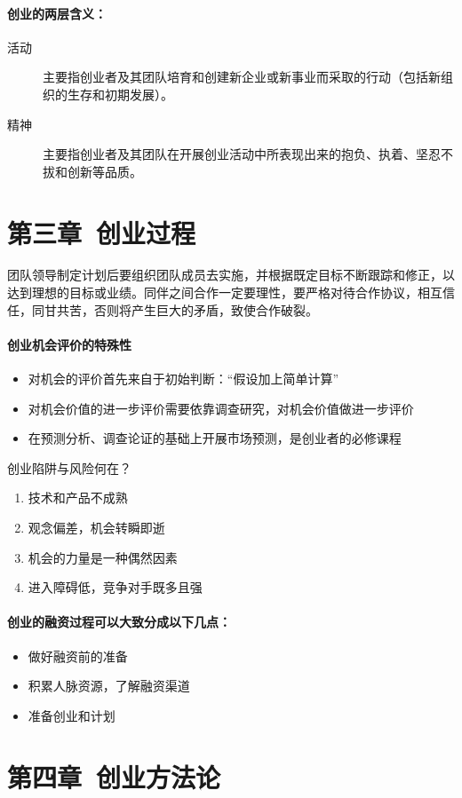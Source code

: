 \documentclass[UTF8]{article}
\begin{document}
\paragraph{创业的两层含义：}
\begin{description}
\item[活动]主要指创业者及其团队培育和创建新企业或新事业而采取的行动（包括新组织的生存和初期发展）。
\item[精神]主要指创业者及其团队在开展创业活动中所表现出来的抱负、执着、坚忍不拔和创新等品质。
\end{description}
\section{第三章\ 创业过程}
团队领导制定计划后要组织团队成员去实施，并根据既定目标不断跟踪和修正，以达到理想的目标或业绩。同伴之间合作一定要理性，要严格对待合作协议，相互信任，同甘共苦，否则将产生巨大的矛盾，致使合作破裂。
\paragraph{创业机会评价的特殊性}
\begin{itemize}
    \item 对机会的评价首先来自于初始判断：“假设加上简单计算”
    \item	对机会价值的进一步评价需要依靠调查研究，对机会价值做进一步评价
    \item	在预测分析、调查论证的基础上开展市场预测，是创业者的必修课程
\end{itemize}
创业陷阱与风险何在？
\begin{enumerate}[1)]
\item 技术和产品不成熟
\item 观念偏差，机会转瞬即逝
\item 机会的力量是一种偶然因素
\item 进入障碍低，竞争对手既多且强
\end{enumerate}
\paragraph{创业的融资过程可以大致分成以下几点：}
\begin{itemize}
\item 做好融资前的准备
\item 积累人脉资源，了解融资渠道
\item 准备创业和计划
\end{itemize}

\section{第四章\ 创业方法论}
\end{document}
